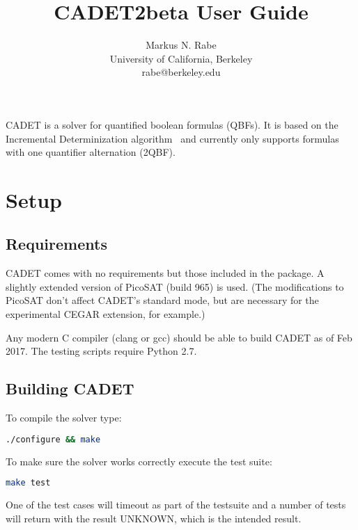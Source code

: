 \documentclass{article}
\title{CADET2beta User Guide}
\author{Markus N. Rabe \\ University of California, Berkeley \\ rabe@berkeley.edu}
\begin{document}
\maketitle

CADET is a solver for quantified boolean formulas (QBFs). 
It is based on the Incremental Determinization algorithm~\cite{RabeSeshia/2016/IncrementalDeterminization} and currently only supports formulas with one quantifier alternation (2QBF).

\tableofcontents


\section{Setup}

\subsection{Requirements}

CADET comes with no requirements but those included in the package. 
A slightly extended version of PicoSAT (build 965) is used. 
(The modifications to PicoSAT don't affect CADET's standard mode, but are necessary for the experimental CEGAR extension, for example.)

Any modern C compiler (clang or gcc) should be able to build CADET as of Feb 2017. 
The testing scripts require Python 2.7.


\subsection{Building CADET}
To compile the solver type:

\begin{lstlisting}[language = bash,
				   basicstyle=\footnotesize\ttfamily,
                   xleftmargin = 1cm,
                   framexleftmargin = 1em]
./configure && make
\end{lstlisting}

\noindent
To make sure the solver works correctly execute the test suite:

\begin{lstlisting}[language = bash,
				   basicstyle=\footnotesize\ttfamily,
                   xleftmargin = 1cm,
                   framexleftmargin = 1em]
make test
\end{lstlisting}
One of the test cases will timeout as part of the testsuite and a number of tests will return with the result UNKNOWN, which is the intended result. 
\end{document}

